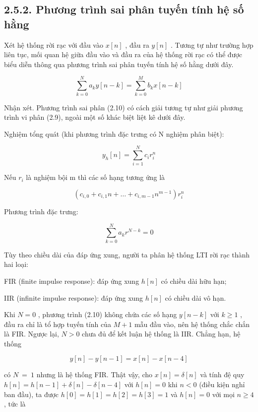 \documentclass[
  10
]{article}
\begin{document}
\subsection{2.5.2. Phương trình sai phân tuyến tính hệ số
hằng}\label{phux1b0ux1a1ng-truxecnh-sai-phuxe2n-tuyux1ebfn-tuxednh-hux1ec7-sux1ed1-hux1eb1ng}

Xét hệ thống rời rạc với đầu vào \(x [ n ]\) , đầu ra \(y [ n ]\) .
Tương tự như trường hợp liên tục, mối quan hệ giữa đầu vào và đầu ra của
hệ thống rời rạc có thể được biểu diễn thông qua phương trình sai phân
tuyến tính hệ số hằng dưới đây.

\[
\sum_ {k = 0} ^ {N} a _ {k} y [ n - k ] = \sum_ {k = 0} ^ {M} b _ {k} x [ n - k ]\tag{2.10}
\]

Nhận xét. Phương trình sai phân (2.10) có cách giải tương tự như giải
phương trình vi phân (2.9), ngoài một số khác biệt liệt kê dưới đây.

Nghiệm tổng quát (khi phương trình đặc trưng có N nghiệm phân biệt):

\[
y _ {h} [ n ] = \sum_ {i = 1} ^ {N} c _ {i} r _ {i} ^ {n}
\]

Nếu \(r _ { i }\) là nghiệm bội m thì các số hạng tương ứng là

\[
\left(c _ {i, 0} + c _ {i, 1} n + \dots + c _ {i, m - 1} n ^ {m - 1}\right) r _ {i} ^ {n}
\]

Phương trình đặc trưng:

\[
\sum_ {k = 0} ^ {N} a _ {k} r ^ {N - k} = 0
\]

Tùy theo chiều dài của đáp ứng xung, người ta phân hệ thống LTI rời rạc
thành hai loại:

FIR (finite impulse response): đáp ứng xung \(h [ n ]\) có chiều dài hữu
hạn;

IIR (infinite impulse response): đáp ứng xung \(h [ n ]\) có chiều dài
vô hạn.

Khi \(N = 0\) , phương trình (2.10) không chứa các số hạng
\(y [ n - k ]\) với \(k \geq 1\) , đầu ra chỉ là tổ hợp tuyến tính của
\(M + 1\) mẫu đầu vào, nên hệ thống chắc chắn là FIR. Ngược lại,
\(N > 0\) chưa đủ để kết luận hệ thống là IIR. Chẳng hạn, hệ thống

\[
y [ n ] - y [ n - 1 ] = x [ n ] - x [ n - 4 ]
\]

có \(N \ = \ 1\) nhưng là hệ thống FIR. Thật vậy, cho
\(x [ n ] = \delta [ n ]\) và tính đệ quy
\(h [ n ] = h [ n - 1 ] + \delta [ n ] - \delta [ n - 4 ]\) với
\(h [ n ] = 0\) khi \(n < 0\) (điều kiện nghỉ ban đầu), ta được
\(h [ 0 ] = h [ 1 ] = h [ 2 ] = h [ 3 ] = 1\) và \(h [ n ] = 0\) với mọi
\(n \geq 4\) , tức là
\end{document}
